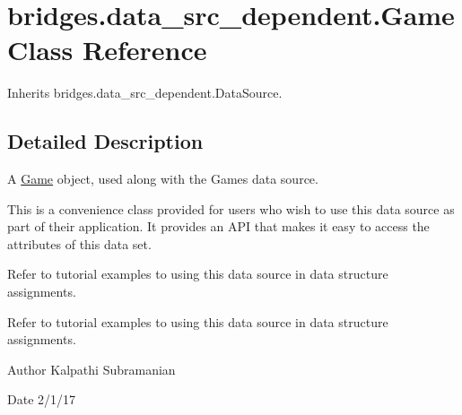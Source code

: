 \hypertarget{classbridges_1_1data__src__dependent_1_1_game}{}\section{bridges.\+data\+\_\+src\+\_\+dependent.\+Game Class Reference}
\label{classbridges_1_1data__src__dependent_1_1_game}


Inherits bridges.\+data\+\_\+src\+\_\+dependent.\+Data\+Source.



\subsection{Detailed Description}
A \hyperlink{classbridges_1_1data__src__dependent_1_1_game}{Game} object, used along with the Games data source. 

This is a convenience class provided for users who wish to use this data source as part of their application. It provides an A\+PI that makes it easy to access the attributes of this data set.

Refer to tutorial examples to using this data source in data structure assignments.

Refer to tutorial examples to using this data source in data structure assignments.

\begin{DoxyAuthor}{Author}
Kalpathi Subramanian 
\end{DoxyAuthor}
\begin{DoxyDate}{Date}
2/1/17 
\end{DoxyDate}
